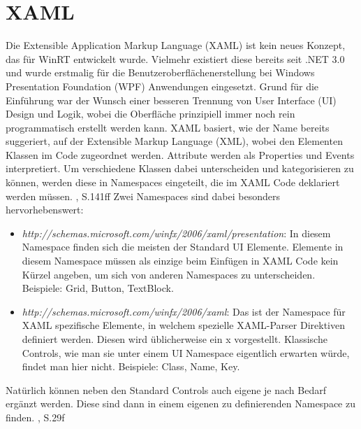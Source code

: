 \documentclass[a4paper,bibtotoc,oneside]{scrbook}
\begin{document}
\section[XAML]{XAML}\label{sec:XAML}
Die Extensible Application Markup Language (XAML) ist kein neues Konzept, das für WinRT entwickelt wurde. Vielmehr existiert diese bereits seit .NET 3.0 und wurde erstmalig für die Benutzeroberflächenerstellung bei Windows Presentation Foundation (WPF) Anwendungen eingesetzt. Grund für die Einführung war der Wunsch einer besseren Trennung von User Interface (UI) Design und Logik, wobei die Oberfläche prinzipiell immer noch rein programmatisch erstellt werden kann.
\newline
\newline
XAML basiert, wie der Name bereits suggeriert, auf der Extensible Markup Language (XML), wobei den Elementen Klassen im Code zugeordnet werden. Attribute werden als Properties und Events interpretiert. Um verschiedene Klassen dabei unterscheiden und kategorisieren zu können, werden diese in Namespaces eingeteilt, die im XAML Code deklariert werden müssen. 
\cite{wpf10}, S.141ff
\newline
\newline
Zwei Namespaces sind dabei besonders hervorhebenswert: 
\begin{itemize}
\item \textit{http://schemas.microsoft.com/winfx/2006/xaml/presentation}:
\newline
In diesem Namespace finden sich die meisten der Standard UI Elemente. Elemente in diesem Namespace müssen als einzige beim Einfügen in XAML Code kein Kürzel angeben, um sich von anderen Namespaces zu unterscheiden.
\newline
\newline
Beispiele: Grid, Button, TextBlock.
\item \textit{http://schemas.microsoft.com/winfx/2006/xaml}:
\newline
Das ist der Namespace für XAML spezifische Elemente, in welchem spezielle XAML-Parser Direktiven definiert werden.
\newline
Diesen wird üblicherweise ein x vorgestellt.
\newline
Klassische Controls, wie man sie unter einem UI Namespace eigentlich erwarten würde, findet man hier nicht.
\newline
\newline
Beispiele: Class, Name, Key.
\end{itemize} 
Natürlich können neben den Standard Controls auch eigene je nach Bedarf ergänzt werden. Diese sind dann in einem eigenen zu definierenden Namespace zu finden. \cite{ana12}, S.29f
\end{document}
